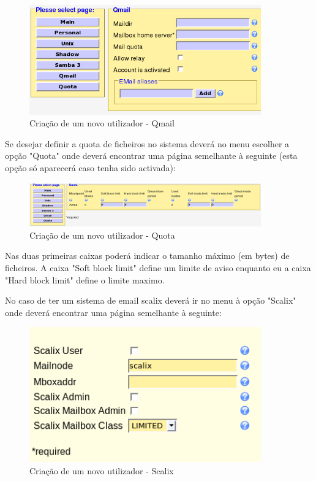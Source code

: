 \begin{figure}[H]
    \begin{center}
        \includegraphics[width=10cm]{include/img/lam12}
    \end{center}
    \caption{Criação de um novo utilizador - Qmail}
    \label{fig:LAM12}
\end{figure}

Se desejar definir a quota de ficheiros no sistema deverá no menu escolher a opção "Quota" onde deverá encontrar uma página semelhante à seguinte (esta opção só aparecerá caso tenha sido activada):

\begin{figure}[H]
    \begin{center}
        \includegraphics[width=10cm]{include/img/lam13}
    \end{center}
    \caption{Criação de um novo utilizador - Quota}
    \label{fig:LAM13}
\end{figure}

Nas duas primeiras caixas poderá indicar o tamanho máximo (em bytes) de ficheiros. A caixa "Soft block limit" define um limite de aviso enquanto eu a caixa "Hard block limit" define o limite maximo.

No caso de ter um sistema de email scalix deverá ir no menu à opção "Scalix" onde deverá encontrar uma página semelhante à seguinte:

\begin{figure}[H]
    \begin{center}
        \includegraphics[width=10cm]{include/img/lam14}
    \end{center}
    \caption{Criação de um novo utilizador - Scalix}
    \label{fig:LAM14}
\end{figure}

